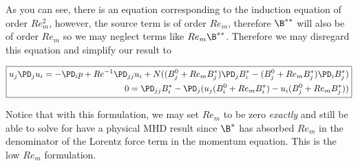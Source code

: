 \documentclass[11pt]{article}
\begin{document}
As you can see, there is an equation corresponding to the induction equation of order $Re_m^2$, however, the source term is of order $Re_m$, therefore $\B^{**}$ will also be of order $Re_m$ so we may neglect terms like $Re_m \B^{**}$. Therefore we may disregard this equation and simplify our result to

\begin{equation}\boxed{
\begin{aligned}
u_j\PD_j u_i =-\PD_i p+ Re^{-1} \PD_{jj} u_i + N ((B_j^0+Re_m B_j^*) \PD_j B_i^* - (B_j^0+Re_m B_j^*) \PD_i B_j^*) \\
0 = \PD_{jj} B_i^* - \PD_j (u_j (B_i^0 + Re_m B_i^{*}) - u_i (B_j^0+Re_m B_j^{*}))
\end{aligned}}\end{equation}

Notice that with this formulation, we may set $Re_m$ to be zero \textit{exactly} and still be able to solve for have a physical MHD result since $\B^*$ has absorbed $Re_m$ in the denominator of the Lorentz force term in the momentum equation. This is the low $Re_m$ formulation.
\end{document}

